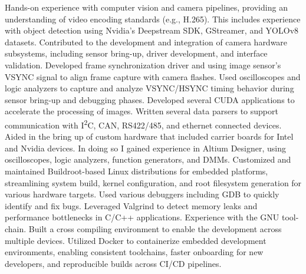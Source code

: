 \documentclass[letterpaper,MMMyyyy,nonstopmode]{simpleresumecv}
\begin{document}
\begin{Body}
    \begin{Detail}
        \BulletItem
        Hands-on experience with computer vision and camera pipelines, providing an understanding of video encoding standards (e.g., H.265). This includes experience with object detection using Nvidia's Deepstream SDK, GStreamer, and YOLOv8 datasets.
        \vspace{1mm} %
        \BulletItem
        Contributed to the development and integration of camera hardware subsystems, including sensor bring-up, driver development, and interface validation.
        \vspace{1mm} %
        \BulletItem
        Developed frame synchronization driver and using image sensor's VSYNC signal to align frame capture with camera flashes.
        \vspace{1mm} %
        \BulletItem
        Used oscilloscopes and logic analyzers to capture and analyze VSYNC/HSYNC timing behavior during sensor bring-up and debugging phases.        \vspace{1mm} %
        \BulletItem
        Developed several CUDA applications to accelerate the processing of images.
        \vspace{1mm} %
        \BulletItem
        Written several data parsers to support communication with I\textsuperscript{2}C, CAN, RS422/485, and ethernet connected devices.
        \vspace{1mm} %
        \BulletItem
        Aided in the bring up of custom hardware that included carrier boards for Intel and Nvidia devices. In doing so I gained experience in Altium Designer, using oscilloscopes, logic analyzers, function generators, and DMMs.
        \vspace{1mm} %
        \BulletItem
        Customized and maintained Buildroot-based Linux distributions for embedded platforms, streamlining system build, kernel configuration, and root filesystem generation for various hardware targets.
        \vspace{1mm} %
        \BulletItem
        Used various debuggers including GDB to quickly identify and fix bugs. Leveraged Valgrind to detect memory leaks and performance bottlenecks in C/C++ applications.
        \vspace{1mm} %
        \BulletItem
        Experience with the GNU tool-chain. Built a cross compiling environment to enable the development across multiple devices.
        \vspace{1mm} %
        \BulletItem
        Utilized Docker to containerize embedded development environments, enabling consistent toolchains, faster onboarding for new developers, and reproducible builds across CI/CD pipelines.
        \vspace{1mm} %
    \end{Detail}


\end{Body}
\end{document}
